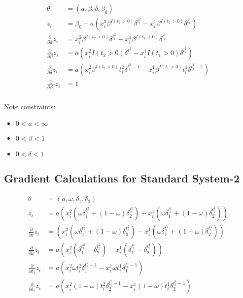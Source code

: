 \documentclass[12pt]{article}
\begin{document}
\begin{align*}
\theta &= (a, \beta, \delta, \beta_0) \\
z_i &= \beta_0 + a (
  x^2_i \beta^{I(t_2 > 0)} \delta^{t^2_i}
  - x^1_i \beta^{I(t_1 > 0)} \delta^{t^1_i}
) \\
\frac{\partial}{\partial a} z_i
  &= x^2_i \beta^{I(t_2 > 0)} \delta^{t^2_i}
  - x^1_i \beta^{I(t_1 > 0)} \delta^{t^1_i} \\
\frac{\partial}{\partial \beta} z_i
  &= a (x^2_i I(t_2 > 0) \delta^{t^2_i} - x^1_i I(t_1 > 0) \delta^{t^1_i}) \\
\frac{\partial}{\partial \delta} z_i
  &= a (
    x^2_i \beta^{I(t_2 > 0)} t^2_i \delta^{t^2_i - 1}
    - x^1_i \beta^{I(t_1 > 0)} t^1_i \delta^{t^1_i - 1}
  ) \\
\frac{\partial}{\partial \beta_0} z_i &= 1 \\
\end{align*}

Note constraints:

\begin{itemize}
    \item{$0 < a < \infty$}
    \item{$0 < \beta < 1$}
    \item{$0 < \delta < 1$}
\end{itemize}

\subsection{Gradient Calculations for Standard System-2}

\begin{align*}
  \theta &= (a, \omega, \delta_1, \delta_2) \\
  z_i &= a (
    x^2_i (\omega \delta_1^{t^2_i} + (1 - \omega) \delta_2^{t^2_i})
    - x^1_i (\omega \delta_1^{t^1_i} + (1 - \omega) \delta_2^{t^1_i})
  ) \\
  \frac{\partial}{\partial a} z_i
    &= (
      x^2_i (\omega \delta_1^{t^2_i} + (1 - \omega) \delta_2^{t^2_i})
      - x^1_i (\omega \delta_1^{t^1_i} + (1 - \omega) \delta_2^{t^1_i})
    ) \\
  \frac{\partial}{\partial \omega} z_i
    &= a (
      x^2_i (\delta_1^{t^2_i} - \delta_2^{t^2_i})
      - x^1_i (\delta_1^{t^1_i} - \delta_2^{t^1_i})
    ) \\
  \frac{\partial}{\partial \delta_1} z_i
    &= a (
      x^2_i \omega t^2_i \delta_1^{t^2_i - 1}
      - x^1_i \omega t^1_i \delta_1^{t^1_i - 1}
    ) \\
  \frac{\partial}{\partial \delta_2} z_i
    &= a (
      x^2_i (1 - \omega) t^2_i \delta_2^{t^2_i - 1}
      - x^1_i (1 - \omega) t^1_i \delta_2^{t^1_i - 1}
    ) \\
\end{align*}
\end{document}
